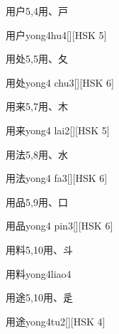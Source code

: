 \begin{Entry}{用户}{5,4}{⽤、⼾}
  \begin{Phonetics}{用户}{yong4hu4}[][HSK 5]
  \end{Phonetics}
\end{Entry}

\begin{Entry}{用处}{5,5}{⽤、⼡}
  \begin{Phonetics}{用处}{yong4 chu3}[][HSK 6]
  \end{Phonetics}
\end{Entry}

\begin{Entry}{用来}{5,7}{⽤、⽊}
  \begin{Phonetics}{用来}{yong4 lai2}[][HSK 5]
  \end{Phonetics}
\end{Entry}

\begin{Entry}{用法}{5,8}{⽤、⽔}
  \begin{Phonetics}{用法}{yong4 fa3}[][HSK 6]
  \end{Phonetics}
\end{Entry}

\begin{Entry}{用品}{5,9}{⽤、⼝}
  \begin{Phonetics}{用品}{yong4 pin3}[][HSK 6]
  \end{Phonetics}
\end{Entry}

\begin{Entry}{用料}{5,10}{⽤、⽃}
  \begin{Phonetics}{用料}{yong4liao4}
  \end{Phonetics}
\end{Entry}

\begin{Entry}{用途}{5,10}{⽤、⾡}
  \begin{Phonetics}{用途}{yong4tu2}[][HSK 4]
  \end{Phonetics}
\end{Entry}

